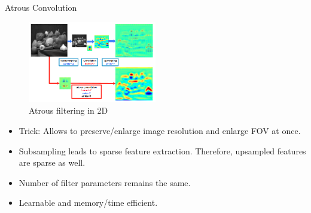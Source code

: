 \documentclass{beamer}
\begin{document}
\begin{frame}{Atrous Convolution}
\begin{figure}
	\centering
	\includegraphics[width=0.5\textwidth]{figure/ss44.png}
	\captionsetup{justification=centering}
	\caption{Atrous filtering in 2D}	
\end{figure}
\vspace{-0.4cm}
\begin{itemize}
	\item Trick: Allows to preserve/enlarge image resolution and enlarge FOV at once.
	\item<2-> Subsampling leads to sparse feature extraction. Therefore, upsampled features are sparse as well.
	\item<3-> Number of filter parameters remains the same.
	\item<4-> Learnable and memory/time efficient.
\end{itemize}	
\end{frame}
\end{document}
